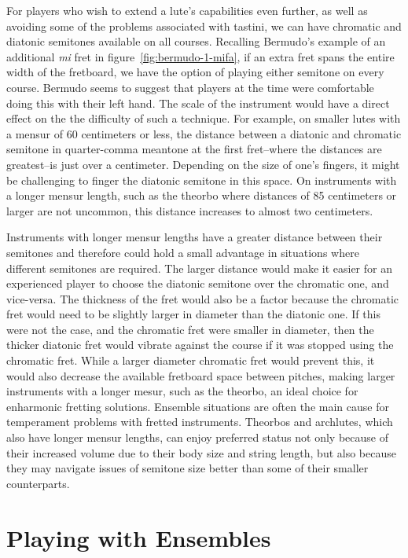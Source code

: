 For players who wish to extend a lute's capabilities even further, as well as avoiding
some of the problems associated with tastini, we can have chromatic and diatonic
semitones available on all courses. Recalling Bermudo's example of an additional
\textit{mi} fret in figure~\ref{fig:bermudo-1-mifa}, if an extra fret spans the entire
width of the fretboard, we have the option of playing either semitone on every course.
Bermudo seems to suggest that players at the time were comfortable doing this with their left
hand.  The scale of the instrument would have a direct effect on the the difficulty of
such a technique.  For example, on smaller lutes with a mensur of 60 centimeters or
less, the distance between a diatonic and chromatic semitone in quarter-comma meantone
at the first fret--where the distances are greatest--is just over a centimeter.
Depending on the size of one's fingers, it might be challenging to finger the diatonic
semitone in this space.  On instruments with a longer mensur length, such as the
theorbo where distances of 85 centimeters or larger are not uncommon, this distance
increases to almost two centimeters.

Instruments with longer mensur lengths have a greater distance between their semitones and therefore
could hold a small advantage in situations where different semitones are required. The larger
distance would make it easier for an experienced player to choose the diatonic semitone over the
chromatic one, and vice-versa. The thickness of the fret would also be a factor because the
chromatic fret would need to be slightly larger in diameter than the diatonic one. If this were not
the case, and the chromatic fret were smaller in diameter, then the thicker diatonic fret would
vibrate against the course if it was stopped using the chromatic fret.  While a larger diameter
chromatic fret would prevent this, it would also decrease the available fretboard space between
pitches, making larger instruments with a longer mesur, such as the theorbo, an ideal choice for
enharmonic fretting solutions.  Ensemble situations are often the main cause for temperament
problems with fretted instruments.  Theorbos and archlutes, which also have longer mensur lengths,
can enjoy preferred status not only because of their increased volume due to their body size and
string length, but also because they may navigate issues of semitone size better than some of their
smaller counterparts.

\section{Playing with Ensembles}

